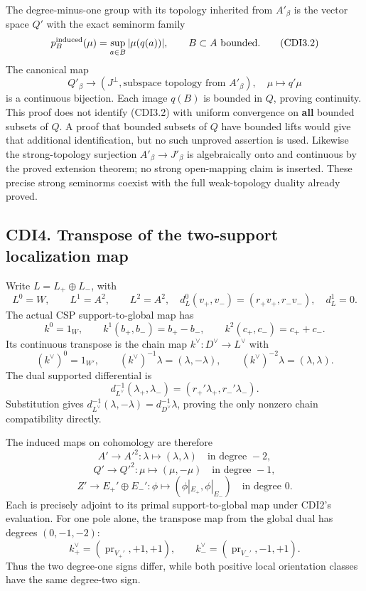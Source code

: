 The degree-minus-one group with its topology inherited from \(A'_\beta\)
is the vector space \(Q'\) with the exact seminorm family \[
p_B^{\rm induced}(\mu)=\sup_{a\in B}|\mu(q(a))|,
\qquad B\subset A\text{ bounded}.
\tag{CDI3.2}
\] The canonical map \[
Q'_\beta\longrightarrow (J^\perp,\text{subspace topology from }A'_\beta),
\quad\mu\longmapsto q'\mu
\tag{CDI3.3}
\] is a continuous bijection. Each image \(q(B)\) is bounded in \(Q\),
proving continuity. This proof does not identify (CDI3.2) with uniform
convergence on \textbf{all} bounded subsets of \(Q\). A proof that
bounded subsets of \(Q\) have bounded lifts would give that additional
identification, but no such unproved assertion is used. Likewise the
strong-topology surjection \(A'_\beta\to J'_\beta\) is algebraically
onto and continuous by the proved extension theorem; no strong
open-mapping claim is inserted. These precise strong seminorms coexist
with the full weak-topology duality already proved.

\subsection{CDI4. Transpose of the two-support localization
map}\label{cdi4.-transpose-of-the-two-support-localization-map}

Write \(L=L_+\oplus L_-\), with \[
L^0=W,\qquad L^1=A^2,\qquad L^2=A^2,
\quad d_L^0(v_+,v_-)=(r_+v_+,r_-v_-),\quad d_L^1=0.
\] The actual CSP support-to-global map has \[
k^0=1_W,\qquad k^1(b_+,b_-)=b_+-b_-,
\qquad k^2(c_+,c_-)=c_++c_-.
\tag{CDI4.1}
\] Its continuous transpose is the chain map \(k^\vee:D^\vee\to L^\vee\)
with \[
(k^\vee)^0=1_{W'},\qquad
(k^\vee)^{-1}\lambda=(\lambda,-\lambda),\qquad
(k^\vee)^{-2}\lambda=(\lambda,\lambda).
\tag{CDI4.2}
\] The dual supported differential is \[
d_{L^\vee}^{-1}(\lambda_+,\lambda_-)
=(r_+'\lambda_+,r_-'\lambda_-).
\tag{CDI4.3}
\] Substitution gives
\(d_{L^\vee}^{-1}(\lambda,-\lambda)=d_{D^\vee}^{-1}\lambda\), proving
the only nonzero chain compatibility directly.

The induced maps on cohomology are therefore \[
A'\longrightarrow A'^2:\lambda\mapsto(\lambda,\lambda)
\quad\text{in degree }-2,
\] \[
Q'\longrightarrow Q'^2:\mu\mapsto(\mu,-\mu)
\quad\text{in degree }-1,
\] \[
Z'\longrightarrow E_+'\oplus E_-':
\phi\longmapsto(\phi|_{E_+},\phi|_{E_-})
\quad\text{in degree }0.
\tag{CDI4.4}
\] Each is precisely adjoint to its primal support-to-global map under
CDI2's evaluation. For one pole alone, the transpose map from the global
dual has degrees \((0,-1,-2)\): \[
k_+^\vee=(\operatorname{pr}_{V_+'},+1,+1),\qquad
k_-^\vee=(\operatorname{pr}_{V_-'},-1,+1).
\tag{CDI4.5}
\] Thus the two degree-one signs differ, while both positive local
orientation classes have the same degree-two sign.


